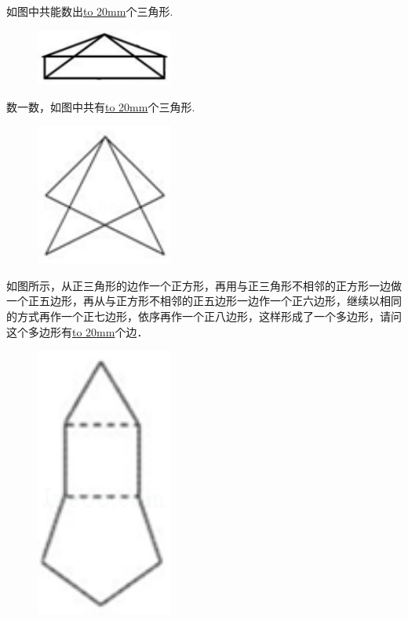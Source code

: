 \item {
    如图中共能数出\underline{\hbox to 20mm{}}个三角形.
    \begin{figure}[H] 
        \centering
        \includegraphics[width=0.4\textwidth]{./pics/Chapter_6/2015_1.png}
    \end{figure}
}


\item {
    数一数，如图中共有\underline{\hbox to 20mm{}}个三角形.
    \begin{figure}[H] 
        \centering
        \includegraphics[width=0.4\textwidth]{./pics/Chapter_6/2015_2.png}
    \end{figure}
}

\item {
    如图所示，从正三角形的边作一个正方形，再用与正三角形不相邻的正方形一边做一个正五边形，再从与正方形不相邻的正五边形一边作一个正六边形，继续以相同的方式再作一个正七边形，依序再作一个正八边形，这样形成了一个多边形，请问这个多边形有\underline{\hbox to 20mm{}}个边．
    \begin{figure}[H] 
        \centering
        \includegraphics[width=0.4\textwidth]{./pics/Chapter_6/2015_3.png}
    \end{figure}
}


